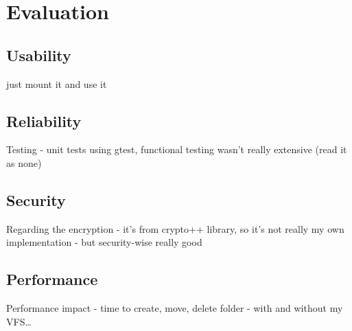 \chapter{Evaluation}

\section{Usability}

just mount it and use it

\section{Reliability}

Testing - unit tests using gtest, functional testing wasn't really extensive (read it as none)

\section{Security}

Regarding the encryption - it's from crypto++ library, so it's not really my own implementation - but security-wise really good

\section{Performance}

Performance impact - time to create, move, delete folder - with and without my VFS\ldots